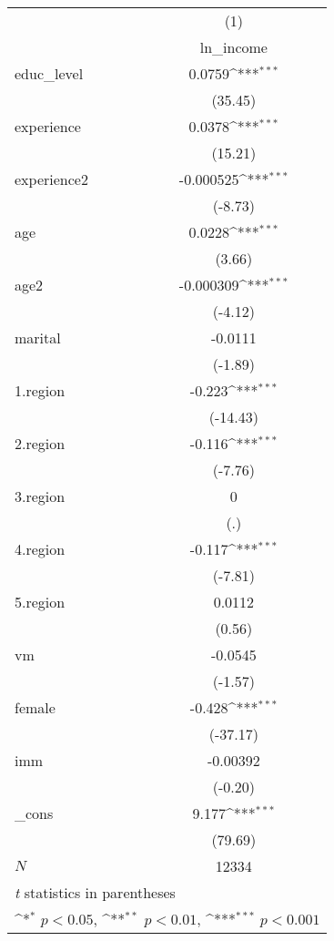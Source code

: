 {
\def\sym#1{\ifmmode^{#1}\else\(^{#1}\)\fi}
\begin{tabular}{l*{1}{c}}
\hline\hline
            &\multicolumn{1}{c}{(1)}\\
            &\multicolumn{1}{c}{ln\_income}\\
\hline
educ\_level  &      0.0759\sym{***}\\
            &     (35.45)         \\
[1em]
experience  &      0.0378\sym{***}\\
            &     (15.21)         \\
[1em]
experience2 &   -0.000525\sym{***}\\
            &     (-8.73)         \\
[1em]
age         &      0.0228\sym{***}\\
            &      (3.66)         \\
[1em]
age2        &   -0.000309\sym{***}\\
            &     (-4.12)         \\
[1em]
marital     &     -0.0111         \\
            &     (-1.89)         \\
[1em]
1.region    &      -0.223\sym{***}\\
            &    (-14.43)         \\
[1em]
2.region    &      -0.116\sym{***}\\
            &     (-7.76)         \\
[1em]
3.region    &           0         \\
            &         (.)         \\
[1em]
4.region    &      -0.117\sym{***}\\
            &     (-7.81)         \\
[1em]
5.region    &      0.0112         \\
            &      (0.56)         \\
[1em]
vm          &     -0.0545         \\
            &     (-1.57)         \\
[1em]
female      &      -0.428\sym{***}\\
            &    (-37.17)         \\
[1em]
imm         &    -0.00392         \\
            &     (-0.20)         \\
[1em]
\_cons      &       9.177\sym{***}\\
            &     (79.69)         \\
\hline
\(N\)       &       12334         \\
\hline\hline
\multicolumn{2}{l}{\footnotesize \textit{t} statistics in parentheses}\\
\multicolumn{2}{l}{\footnotesize \sym{*} \(p<0.05\), \sym{**} \(p<0.01\), \sym{***} \(p<0.001\)}\\
\end{tabular}
}
